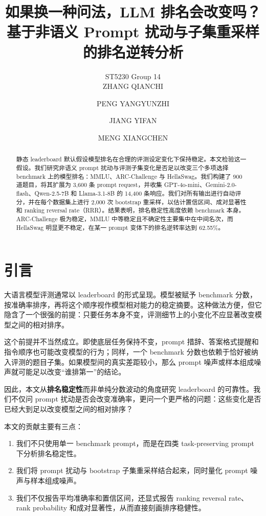 \documentclass[11pt,a4paper]{ctexart}
\title{如果换一种问法，LLM 排名会改变吗？\\
\large 基于非语义 Prompt 扰动与子集重采样的排名逆转分析}
\author{ST5230 Group 14\\
ZHANG QIANCHI \and PENG YANGYUNZHI \and JIANG YIFAN \and MENG XIANGCHEN}
\date{}
\begin{document}
\maketitle

\begin{abstract}
静态 leaderboard 默认假设模型排名在合理的评测设定变化下保持稳定。本文检验这一假设。我们研究非语义 prompt 扰动与评测子集变化是否足以改变三个多项选择 benchmark 上的模型排名：MMLU、ARC-Challenge 与 HellaSwag。我们构建了 900 道题目，将其扩展为 3,600 条 prompt request，并收集 GPT-4o-mini、Gemini-2.0-flash、Qwen-2.5-7B 和 Llama-3.1-8B 的 14,400 条响应。我们对所有输出进行自动评分，并在每个数据集上进行 2,000 次 bootstrap 重采样，以估计置信区间、成对显著性和 ranking reversal rate（RRR）。结果表明，排名稳定性高度依赖 benchmark 本身。ARC-Challenge 极为稳定，MMLU 中等稳定且不确定性主要集中在中间名次，而 HellaSwag 明显更不稳定，在某一 prompt 变体下的排名逆转率达到 62.55\%。
\end{abstract}

\section{引言}

大语言模型评测通常以 leaderboard 的形式呈现。模型被赋予 benchmark 分数，按准确率排序，再将这个顺序视作模型相对能力的稳定摘要。这种做法方便，但它隐含了一个很强的前提：只要任务本身不变，评测细节上的小变化不应显著改变模型之间的相对排序。

这个前提并不当然成立。即使底层任务保持不变，prompt 措辞、答案格式提醒和指令顺序也可能改变模型的行为；同样，一个 benchmark 分数也依赖于恰好被纳入评测的题目子集。如果模型间的真实差距较小，那么 prompt 噪声或样本组成噪声就可能足以改变“谁排第一”的结论。

因此，本文从\textbf{排名稳定性}而非单纯分数波动的角度研究 leaderboard 的可靠性。我们不仅问 prompt 扰动是否会改变准确率，更问一个更严格的问题：这些变化是否已经大到足以改变模型之间的相对排序？

本文的贡献主要有三点：
\begin{enumerate}[leftmargin=1.5em]
\item 我们不只使用单一 benchmark prompt，而是在四类 task-preserving prompt 下分析排名稳定性。
\item 我们将 prompt 扰动与 bootstrap 子集重采样结合起来，同时量化 prompt 噪声与样本组成噪声。
\item 我们不仅报告平均准确率和置信区间，还显式报告 ranking reversal rate、rank probability 和成对显著性，从而直接刻画排序稳健性。
\end{enumerate}
\end{document}
